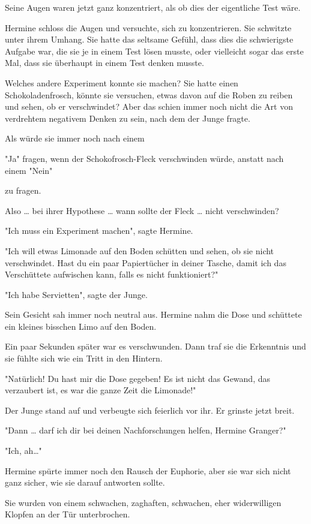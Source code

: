 {Seine Augen waren jetzt ganz konzentriert, als ob dies der eigentliche Test wäre.

Hermine schloss die Augen und versuchte, sich zu konzentrieren. Sie schwitzte unter ihrem Umhang. Sie hatte das seltsame Gefühl, dass dies die schwierigste Aufgabe war, die sie je in einem Test lösen musste, oder vielleicht sogar das erste Mal, dass sie überhaupt in einem Test denken musste.

Welches andere Experiment konnte sie machen? Sie hatte einen Schokoladenfrosch, könnte sie versuchen, etwas davon auf die Roben zu reiben und sehen, ob er verschwindet? Aber das schien immer noch nicht die Art von verdrehtem negativem Denken zu sein, nach dem der Junge fragte.

Als würde sie immer noch nach einem

"Ja" fragen, wenn der Schokofrosch-Fleck verschwinden würde, anstatt nach einem "Nein"

zu fragen.

Also … bei ihrer Hypothese … wann sollte der Fleck … nicht verschwinden?

"Ich muss ein Experiment machen", sagte Hermine.

"Ich will etwas Limonade auf den Boden schütten und sehen, ob sie nicht verschwindet. Hast du ein paar Papiertücher in deiner Tasche, damit ich das Verschüttete aufwischen kann, falls es nicht funktioniert?"

"Ich habe Servietten", sagte der Junge.

Sein Gesicht sah immer noch neutral aus. Hermine nahm die Dose und schüttete ein kleines bisschen Limo auf den Boden.

Ein paar Sekunden später war es verschwunden. Dann traf sie die Erkenntnis und sie fühlte sich wie ein Tritt in den Hintern.

"Natürlich! Du hast mir die Dose gegeben! Es ist nicht das Gewand, das verzaubert ist, es war die ganze Zeit die Limonade!"

Der Junge stand auf und verbeugte sich feierlich vor ihr. Er grinste jetzt breit.

"Dann … darf ich dir bei deinen Nachforschungen helfen, Hermine Granger?"

"Ich, ah…"

Hermine spürte immer noch den Rausch der Euphorie, aber sie war sich nicht ganz sicher, wie sie darauf antworten sollte.

Sie wurden von einem schwachen, zaghaften, schwachen, eher widerwilligen Klopfen an der Tür unterbrochen.

}
